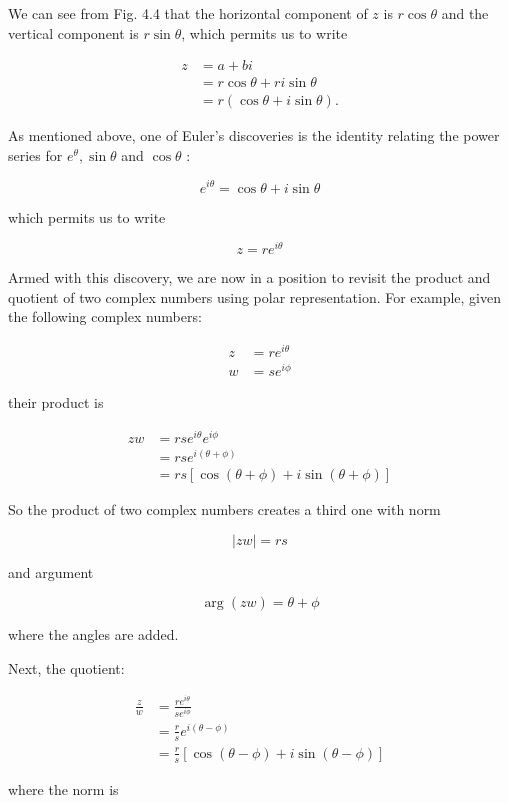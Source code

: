 \documentclass[10pt]{article}
\begin{document}
We can see from Fig. 4.4 that the horizontal component of $z$ is $r \cos \theta$ and the vertical component is $r \sin \theta$, which permits us to write

$$
\begin{aligned}
z & =a+b i \\
& =r \cos \theta+r i \sin \theta \\
& =r(\cos \theta+i \sin \theta) .
\end{aligned}
$$

As mentioned above, one of Euler's discoveries is the identity relating the power series for $e^{\theta}, \sin \theta$ and $\cos \theta$ :

$$
e^{i \theta}=\cos \theta+i \sin \theta
$$

which permits us to write

$$
z=r e^{i \theta}
$$

Armed with this discovery, we are now in a position to revisit the product and quotient of two complex numbers using polar representation. For example, given the following complex numbers:

$$
\begin{aligned}
z & =r e^{i \theta} \\
w & =s e^{i \phi}
\end{aligned}
$$

their product is

$$
\begin{aligned}
z w & =r s e^{i \theta} e^{i \phi} \\
& =r s e^{i(\theta+\phi)} \\
& =r s[\cos (\theta+\phi)+i \sin (\theta+\phi)]
\end{aligned}
$$

So the product of two complex numbers creates a third one with norm

$$
|z w|=r s
$$

and argument

$$
\arg (z w)=\theta+\phi
$$

where the angles are added.

Next, the quotient:

$$
\begin{aligned}
\frac{z}{w} & =\frac{r e^{i \theta}}{s e^{i \phi}} \\
& =\frac{r}{s} e^{i(\theta-\phi)} \\
& =\frac{r}{s}[\cos (\theta-\phi)+i \sin (\theta-\phi)]
\end{aligned}
$$

where the norm is
\end{document}
